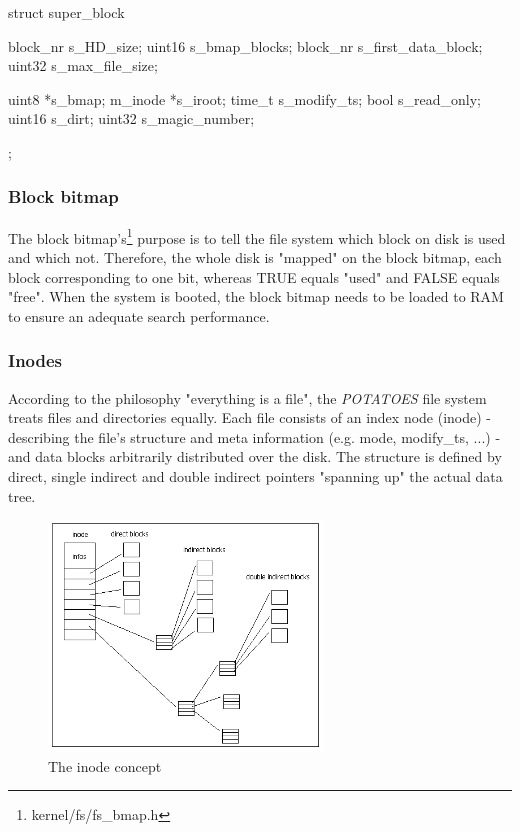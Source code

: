 \documentclass[11pt,a4paper]{scrartcl}
\begin{document}
\begin{code}
struct super_block {
		block_nr s_HD_size;
		uint16  s_bmap_blocks;
		block_nr s_first_data_block;
		uint32 s_max_file_size;

		uint8 *s_bmap;
		m_inode *s_iroot;
		time_t s_modify_ts;
		bool s_read_only;
		uint16 s_dirt;
		uint32 s_magic_number;
};
\end{code}

\subsubsection{Block bitmap}
\hypertarget{blockbitmap}{}
The block bitmap's\footnote{kernel/fs/fs\_bmap.h} purpose is to tell the file system which block on disk is used and which not. Therefore, the whole disk is "mapped" on the block bitmap, each block corresponding to one bit, whereas TRUE equals "used" and FALSE equals "free". When the system is booted, the block bitmap needs to be loaded to RAM to ensure an adequate search performance.

\subsubsection{Inodes}
According to the philosophy "everything is a file", the \textit{POTATOES} file system treats files and directories equally. Each file consists of an index node (inode) - describing the file's structure and meta information (e.g. mode, modify\_ts, ...) - and data blocks arbitrarily distributed over the disk. The structure is defined by direct, single indirect and double indirect pointers "spanning up" the actual data tree.

\begin{figure}
\hspace{0.1cm}
\includegraphics[width=0.65\textwidth]{inode_concept.png}
\caption {The inode concept}
\end{figure}
\end{document}
